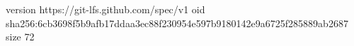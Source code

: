 version https://git-lfs.github.com/spec/v1
oid sha256:6cb3698f5b9afb17ddaa3ec88f230954e597b9180142e9a6725f285889ab2687
size 72
